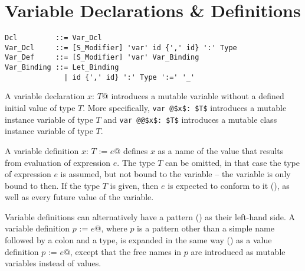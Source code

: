 \section{Variable Declarations \& Definitions}
\label{sec:variable-dcl-def}

\grammar\begin{lstlisting}
Dcl         ::= Var_Dcl
Var_Dcl     ::= [S_Modifier] 'var' id {',' id} ':' Type
Var_Def     ::= [S_Modifier] 'var' Var_Binding
Var_Binding ::= Let_Binding
              | id {',' id} ':' Type ':=' '_'
\end{lstlisting}

A variable declaration \lstinline@var $x$: $T$@ introduces a mutable variable without a defined initial value of type $T$. More specifically, \lstinline+var @$x$: $T$+ introduces a mutable instance variable of type $T$ and \lstinline+var @@$x$: $T$+ introduces a mutable class instance variable of type $T$. 

A variable definition \lstinline@var $x$: $T$ := $e$@ defines $x$ as a name of the value that results from evaluation of expression $e$. The type $T$ can be omitted, in that case the type of expression $e$ is assumed, but not bound to the variable -- the variable is only bound to  then. If the type $T$ is given, then $e$ is expected to conform to it (), as well as every future value of the variable. 

Variable definitions can alternatively have a pattern () as their left-hand side. A variable definition \lstinline@var $p$ := $e$@, where $p$ is a pattern other than a simple name followed by a colon and a type, is expanded in the same way () as a value definition \lstinline@val $p$ := $e$@, except that the free names in $p$ are introduced as mutable variables instead of values. 


